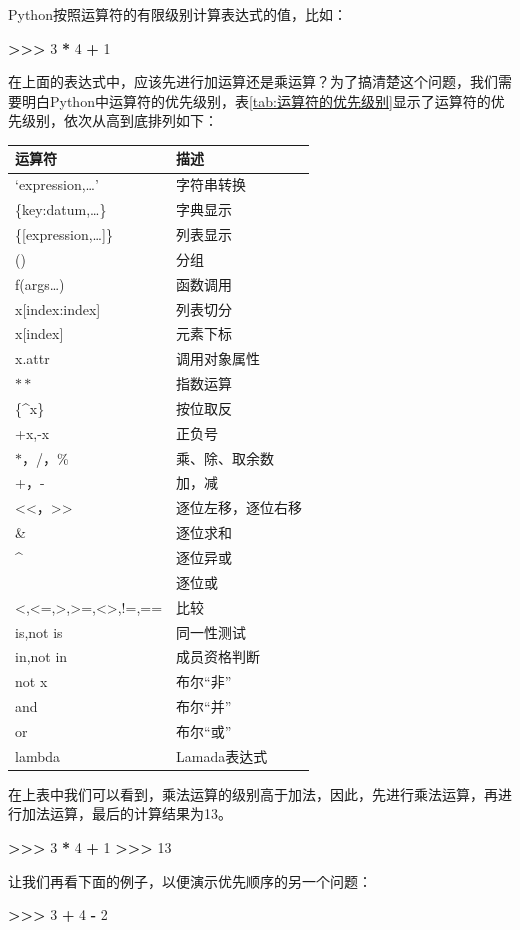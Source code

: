 \documentclass[]{ctexbook}
\newenvironment{Shaded}{\begin{snugshade}}{\end{snugshade}}
\newcommand{\DecValTok}[1]{\textcolor[rgb]{0.00,0.00,0.81}{#1}}
\newcommand{\OperatorTok}[1]{\textcolor[rgb]{0.81,0.36,0.00}{\textbf{#1}}}
\begin{document}
Python按照运算符的有限级别计算表达式的值，比如：

\begin{Shaded}
\begin{Highlighting}[]
\OperatorTok{>>>} \DecValTok{3} \OperatorTok{*} \DecValTok{4} \OperatorTok{+} \DecValTok{1}
\end{Highlighting}
\end{Shaded}

在上面的表达式中，应该先进行加运算还是乘运算？为了搞清楚这个问题，我们需要明白Python中运算符的优先级别，表\ref{tab:运算符的优先级别}显示了运算符的优先级别，依次从高到底排列如下：

\begin{longtable}[]{@{}ll@{}}
\toprule
运算符 & 描述\tabularnewline
\midrule
\endhead
`expression,\ldots{}' & 字符串转换\tabularnewline
\{key:datum,\ldots\} & 字典显示\tabularnewline
\{{[}expression,\ldots{]}\} & 列表显示\tabularnewline
() & 分组\tabularnewline
f(args\ldots) & 函数调用\tabularnewline
x{[}index:index{]} & 列表切分\tabularnewline
x{[}index{]} & 元素下标\tabularnewline
x.attr & 调用对象属性\tabularnewline
\(**\) & 指数运算\tabularnewline
\{\^{}x\} & 按位取反\tabularnewline
+x,-x & 正负号\tabularnewline
\(*\)，/，\% & 乘、除、取余数\tabularnewline
+，- & 加，减\tabularnewline
\textless\textless，\textgreater\textgreater{} & 逐位左移，逐位右移\tabularnewline
\& & 逐位求和\tabularnewline
\^{} & 逐位异或\tabularnewline
\textbar{} & 逐位或\tabularnewline
\textless,\textless=,\textgreater,\textgreater=,\textless\textgreater,!=,== & 比较\tabularnewline
is,not is & 同一性测试\tabularnewline
in,not in & 成员资格判断\tabularnewline
not x & 布尔``非''\tabularnewline
and & 布尔``并''\tabularnewline
or & 布尔``或''\tabularnewline
lambda & Lamada表达式\tabularnewline
\bottomrule
\end{longtable}

在上表中我们可以看到，乘法运算的级别高于加法，因此，先进行乘法运算，再进行加法运算，最后的计算结果为13。

\begin{Shaded}
\begin{Highlighting}[]
\OperatorTok{>>>} \DecValTok{3} \OperatorTok{*} \DecValTok{4} \OperatorTok{+} \DecValTok{1}
\OperatorTok{>>>} \DecValTok{13}
\end{Highlighting}
\end{Shaded}

让我们再看下面的例子，以便演示优先顺序的另一个问题：

\begin{Shaded}
\begin{Highlighting}[]
\OperatorTok{>>>} \DecValTok{3} \OperatorTok{+} \DecValTok{4} \OperatorTok{-} \DecValTok{2}
\end{Highlighting}
\end{Shaded}
\end{document}
